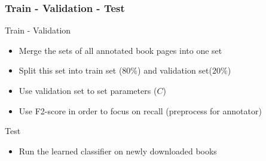 \begin{frame}
\frametitle{Train - Validation - Test}

\begin{block}{Train - Validation}
\begin{itemize}
\item Merge the sets of all annotated book pages into one set
\item Split this set into train set ($80\%$) and validation set($20\%$)
\item Use validation set to set parameters ($C$)
\item Use F2-score in order to focus on recall (preprocess for annotator)
\end{itemize}
\end{block}

\begin{block}{Test}
\begin{itemize}
\item Run the learned classifier on newly downloaded books
\end{itemize}
\end{block}
\end{frame}

